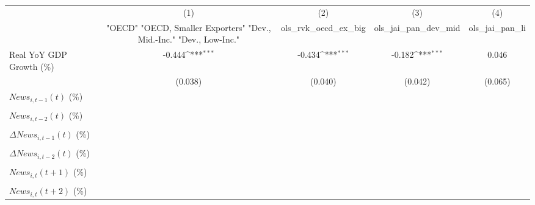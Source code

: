 {
\def\sym#1{\ifmmode^{#1}\else\(^{#1}\)\fi}
\begin{tabular}{l*{4}{c}}
\toprule
                    &\multicolumn{1}{c}{(1)}&\multicolumn{1}{c}{(2)}&\multicolumn{1}{c}{(3)}&\multicolumn{1}{c}{(4)}\\
                    &\multicolumn{1}{c}{ "OECD" "OECD, Smaller Exporters" "Dev., Mid.-Inc." "Dev., Low-Inc."}&\multicolumn{1}{c}{ols_rvk_oecd_ex_big}&\multicolumn{1}{c}{ols_jai_pan_dev_mid}&\multicolumn{1}{c}{ols_jai_pan_li}\\
\midrule
Real YoY GDP Growth (\%)&      -0.444\sym{***}&      -0.434\sym{***}&      -0.182\sym{***}&       0.046         \\
                    &     (0.038)         &     (0.040)         &     (0.042)         &     (0.065)         \\
\addlinespace
$ News_{i,t-1}(t)$ (\%)&                     &                     &                     &                     \\
                    &                     &                     &                     &                     \\
\addlinespace
$ News_{i,t-2}(t)$ (\%)&                     &                     &                     &                     \\
                    &                     &                     &                     &                     \\
\addlinespace
$ \Delta News_{i,t-1}(t)$ (\%)&                     &                     &                     &                     \\
                    &                     &                     &                     &                     \\
\addlinespace
$ \Delta News_{i,t-2}(t)$ (\%)&                     &                     &                     &                     \\
                    &                     &                     &                     &                     \\
\addlinespace
$ News_{i,t}(t+1)$ (\%)&                     &                     &                     &                     \\
                    &                     &                     &                     &                     \\
\addlinespace
$ News_{i,t}(t+2)$ (\%)&                     &                     &                     &                     \\

\end{tabular}}
